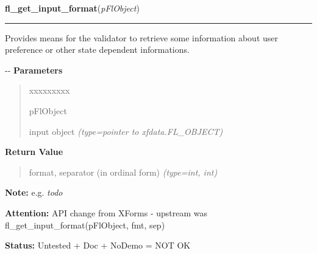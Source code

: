 \hspace{.8\funcindent}\begin{boxedminipage}{\funcwidth}

    \raggedright \textbf{fl\_get\_input\_format}(\textit{pFlObject})

    \vspace{-1.5ex}

    \rule{\textwidth}{0.5\fboxrule}
\setlength{\parskip}{2ex}

Provides means for the validator to retrieve some information about
user preference or other state dependent informations.

-{}-
\setlength{\parskip}{1ex}
      \textbf{Parameters}
      \vspace{-1ex}

      \begin{quote}
        \begin{Ventry}{xxxxxxxxx}

          \item[pFlObject]


input object
            {\it (type=pointer to xfdata.FL\_OBJECT)}

        \end{Ventry}

      \end{quote}

      \textbf{Return Value}
    \vspace{-1ex}

      \begin{quote}

format, separator (in ordinal form)
      {\it (type=int, int)}

      \end{quote}

\textbf{Note:} 
e.g. \emph{todo}


\textbf{Attention:} 
API change from XForms - upstream was
fl\_get\_input\_format(pFlObject, fmt, sep)


\textbf{Status:} 
Untested + Doc + NoDemo = NOT OK


    \end{boxedminipage}

    \label{xformslib:flinput:fl_get_input}

    \vspace{0.5ex}

